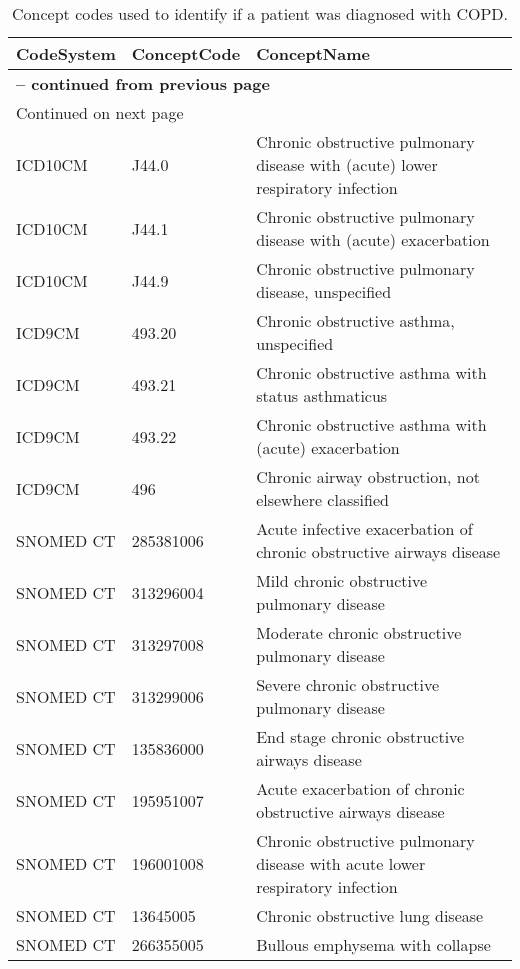 \begin{longtable}{p{}p{}p{}}
\caption{Concept codes used to identify if a patient was diagnosed with COPD.} \\ 
 CodeSystem & ConceptCode & ConceptName \\ 
  \hline 
\endfirsthead 
\multicolumn{3}{p{\textwidth}}{{ \bfseries \tablename \thetable{} -- continued from previous page}} \ 
\hline CodeSystem & ConceptCode & ConceptName \\ \hline 
\endhead 
\hline \multicolumn{3}{p{\textwidth}}{{Continued on next page}} \\ \hline 
\endfoot 
\hline 
\endlastfoot 
 \hline
ICD10CM & J44.0 & Chronic obstructive pulmonary disease with (acute) lower respiratory infection \\ 
  ICD10CM & J44.1 & Chronic obstructive pulmonary disease with (acute) exacerbation \\ 
  ICD10CM & J44.9 & Chronic obstructive pulmonary disease, unspecified \\ 
  ICD9CM & 493.20 & Chronic obstructive asthma, unspecified \\ 
  ICD9CM & 493.21 & Chronic obstructive asthma with status asthmaticus \\ 
  ICD9CM & 493.22 & Chronic obstructive asthma with (acute) exacerbation \\ 
  ICD9CM & 496 & Chronic airway obstruction, not elsewhere classified \\ 
  SNOMED CT & 285381006 & Acute infective exacerbation of chronic obstructive airways disease \\ 
  SNOMED CT & 313296004 & Mild chronic obstructive pulmonary disease \\ 
  SNOMED CT & 313297008 & Moderate chronic obstructive pulmonary disease \\ 
  SNOMED CT & 313299006 & Severe chronic obstructive pulmonary disease \\ 
  SNOMED CT & 135836000 & End stage chronic obstructive airways disease \\ 
  SNOMED CT & 195951007 & Acute exacerbation of chronic obstructive airways disease \\ 
  SNOMED CT & 196001008 & Chronic obstructive pulmonary disease with acute lower respiratory infection \\ 
  SNOMED CT & 13645005 & Chronic obstructive lung disease \\ 
  SNOMED CT & 266355005 & Bullous emphysema with collapse \\ 

\end{longtable}
